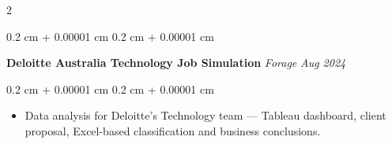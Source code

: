 \documentclass[10pt, letterpaper]{article}
\newenvironment{onecolentry}{
    \begin{adjustwidth}{
        0.2 cm + 0.00001 cm
    }{
        0.2 cm + 0.00001 cm
    }
}{
    \end{adjustwidth}
} %
\begin{document}
\begin{paracol}{2}
        
            \begin{onecolentry}
                \textbf{Deloitte Australia Technology Job Simulation}\newline
                \textit{Forage} \hfill \textit{Aug 2024}
            \end{onecolentry}
            \begin{onecolentry}
                \vspace{0.05 cm}
                \begin{itemize}
                    \item Data analysis for Deloitte's Technology team — Tableau dashboard, client proposal, Excel-based classification and business conclusions.
                \end{itemize}
            \vspace{0.05 cm}
            \end{onecolentry}




    \end{paracol}
\end{document}
